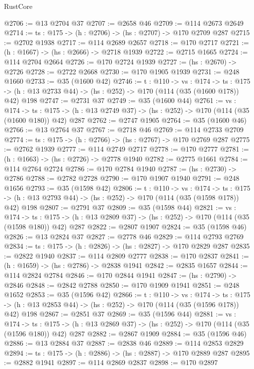 \begin{lexlean}{RustCore}
\begin{coremodule}
@2706 := @13 @2704 @37
@2707 := @2658 @46
@2709 := @114 @2673 @2649
@2714 := {ts : @175} -> (h : @2706) -> (hs : @2707) -> @170 @2709 @287
@2715 := @2702 @1938
@2717 := @114 @2689 @2657
@2718 := @170 @2717
@2721 := (h : @1667) -> (hs : @2666) -> @2718 @1939
@2722 := @2715 @1665
@2724 := @114 @2704 @2664
@2726 := @170 @2724 @1939
@2727 := (hs : @2670) -> @2726
@2728 := @2722 @2668
@2730 := @170 @1905 @1939
@2731 := @248 @1660
@2733 := @35 (@1600 @42)
@2746 := {t : @110} ->
  {vs : @174} ->
  {ts : @175} -> (h : @13 @2733 @44) -> (hs : @252) -> @170 (@114 (@35 (@1600 @178)) @42) @198
@2747 := @2731 @37
@2749 := @35 (@1600 @44)
@2761 := {vs : @174} ->
  {ts : @175} -> (h : @13 @2749 @37) -> (hs : @252) -> @170 (@114 (@35 (@1600 @180)) @42) @287
@2762 := @2747 @1905
@2764 := @35 (@1600 @46)
@2766 := @13 @2764 @37
@2767 := @2718 @46
@2769 := @114 @2733 @2709
@2774 := {ts : @175} -> (h : @2766) -> (hs : @2767) -> @170 @2769 @287
@2775 := @2762 @1939
@2777 := @114 @2749 @2717
@2778 := @170 @2777
@2781 := (h : @1663) -> (hs : @2726) -> @2778 @1940
@2782 := @2775 @1661
@2784 := @114 @2764 @2724
@2786 := @170 @2784 @1940
@2787 := (hs : @2730) -> @2786
@2788 := @2782 @2728
@2790 := @170 @1907 @1940
@2791 := @248 @1656
@2793 := @35 (@1598 @42)
@2806 := {t : @110} ->
  {vs : @174} ->
  {ts : @175} -> (h : @13 @2793 @44) -> (hs : @252) -> @170 (@114 (@35 (@1598 @178)) @42) @198
@2807 := @2791 @37
@2809 := @35 (@1598 @44)
@2821 := {vs : @174} ->
  {ts : @175} -> (h : @13 @2809 @37) -> (hs : @252) -> @170 (@114 (@35 (@1598 @180)) @42) @287
@2822 := @2807 @1907
@2824 := @35 (@1598 @46)
@2826 := @13 @2824 @37
@2827 := @2778 @46
@2829 := @114 @2793 @2769
@2834 := {ts : @175} -> (h : @2826) -> (hs : @2827) -> @170 @2829 @287
@2835 := @2822 @1940
@2837 := @114 @2809 @2777
@2838 := @170 @2837
@2841 := (h : @1659) -> (hs : @2786) -> @2838 @1941
@2842 := @2835 @1657
@2844 := @114 @2824 @2784
@2846 := @170 @2844 @1941
@2847 := (hs : @2790) -> @2846
@2848 := @2842 @2788
@2850 := @170 @1909 @1941
@2851 := @248 @1652
@2853 := @35 (@1596 @42)
@2866 := {t : @110} ->
  {vs : @174} ->
  {ts : @175} -> (h : @13 @2853 @44) -> (hs : @252) -> @170 (@114 (@35 (@1596 @178)) @42) @198
@2867 := @2851 @37
@2869 := @35 (@1596 @44)
@2881 := {vs : @174} ->
  {ts : @175} -> (h : @13 @2869 @37) -> (hs : @252) -> @170 (@114 (@35 (@1596 @180)) @42) @287
@2882 := @2867 @1909
@2884 := @35 (@1596 @46)
@2886 := @13 @2884 @37
@2887 := @2838 @46
@2889 := @114 @2853 @2829
@2894 := {ts : @175} -> (h : @2886) -> (hs : @2887) -> @170 @2889 @287
@2895 := @2882 @1941
@2897 := @114 @2869 @2837
@2898 := @170 @2897

\end{coremodule}
\end{lexlean}

